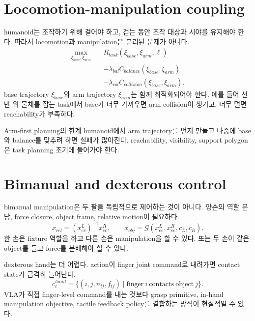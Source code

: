 \section{Locomotion-manipulation coupling}

humanoid는 조작하기 위해 걸어야 하고, 걷는 동안 조작 대상과 시야를 유지해야 한다. 따라서 locomotion과 manipulation은 분리된 문제가 아니다.
\begin{equation}
  \begin{aligned}
  \max_{\xi_{base}, \xi_{arm}}\quad
  &R_{task}(\xi_{base},\xi_{arm},\ell)\\
  &-\lambda_{bal} C_{balance}(\xi_{base},\xi_{arm})\\
  &-\lambda_{col} C_{collision}(\xi_{base},\xi_{arm}).
  \end{aligned}
  \label{eq:ch20-loco-manip}
\end{equation}
base trajectory $\xi_{base}$와 arm trajectory $\xi_{arm}$는 함께 최적화되어야 한다. 예를 들어 선반 위 물체를 잡는 task에서 base가 너무 가까우면 arm collision이 생기고, 너무 멀면 reachability가 부족하다.

\begin{warningbox}{Arm-first planning의 한계}
humanoid에서 arm trajectory를 먼저 만들고 나중에 base와 balance를 맞추려 하면 실패가 많아진다. reachability, visibility, support polygon은 task planning 초기에 들어가야 한다.
\end{warningbox}

\section{Bimanual and dexterous control}

bimanual manipulation은 두 팔을 독립적으로 제어하는 것이 아니다. 양손의 역할 분담, force closure, object frame, relative motion이 필요하다.
\begin{equation}
  x_{rel}
  =
  (x_{ee}^{L})^{-1} x_{ee}^{R},
  \qquad
  x_{obj}
  =
  \mathcal{G}(x_{ee}^{L},x_{ee}^{R},c_L,c_R).
  \label{eq:ch20-bimanual}
\end{equation}
한 손은 fixture 역할을 하고 다른 손은 manipulation을 할 수 있다. 또는 두 손이 같은 object를 들고 force를 분배해야 할 수 있다.

dexterous hand는 더 어렵다. action이 finger joint command로 내려가면 contact state가 급격히 늘어난다.
\begin{equation}
  c_t^{hand}
  =
  \{
  (i,j,n_{ij},f_{ij})
  \mid
  \mathrm{finger}\ i
  \ \mathrm{contacts}\ 
  \mathrm{object}\ j
  \}.
  \label{eq:ch20-hand-contact}
\end{equation}
VLA가 직접 finger-level command를 내는 것보다 grasp primitive, in-hand manipulation objective, tactile feedback policy를 결합하는 방식이 현실적일 수 있다.

